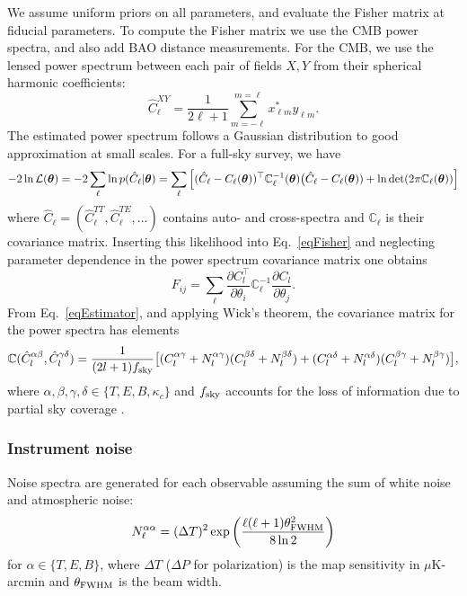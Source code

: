 We assume uniform priors on all parameters, and evaluate the Fisher matrix at fiducial parameters. To compute the Fisher matrix we use the CMB power spectra, and also add BAO distance measurements. For the CMB, we use the lensed power spectrum between each pair of fields $X, Y$ from their spherical harmonic coefficients:
%
\begin{equation}
\label{eqEstimator}
\hat{C}^{XY}_\ell = \frac{1}{2\ell+1}\sum_{m=-\ell}^{m=\ell} x^{*}_{\ell m} y_{\ell m}.
\end{equation}
%
The estimated power spectrum follows a Gaussian distribution to good approximation at small scales. For a full-sky survey, we have 
%
\begin{equation}
-2\ln\mathcal{L}(\boldsymbol{\theta}) = -2\sum_\ell \ln p( \hat{C}_\ell | \boldsymbol{\theta}) \\
=  \sum_\ell  \Big[ (\hat{C}_\ell - C_\ell(\boldsymbol{\theta}) )^\top  \mathbb{C}^{-1}_\ell(\boldsymbol{\theta}) \big(\hat{C}_\ell - C_\ell(\boldsymbol{\theta})) + \ln \det(2 \pi \mathbb{C}_\ell(\boldsymbol{\theta})) \Big]
\end{equation}
%
where $ \hat{C}_\ell = (\hat{C}_\ell^{TT}, \hat{C}_\ell^{TE}, ...) $ contains auto- and cross-spectra and $\mathbb{C}_\ell$ is their covariance matrix. Inserting this likelihood into Eq.~\ref{eqFisher} and neglecting parameter dependence in the power spectrum covariance matrix one obtains
%
\begin{equation}
F_{ij} = \sum_\ell \frac{\partial C^\top_l}{\partial \theta_i} \mathbb{C}^{-1}_\ell \frac{\partial C_l}{\partial \theta_j}.
\end{equation}
%
From Eq.~\ref{eqEstimator}, and applying Wick's theorem, the covariance matrix for the power spectra has elements
%
\begin{equation}
\mathbb{C}(\hat{C}_l^{\alpha \beta}, \hat{C}_l^{\gamma \delta}) = \frac{1}{(2l+1)f_{\rm sky}} \big[ (C_l^{\alpha \gamma} + N_l^{\alpha \gamma}) (C_l^{\beta \delta} + N_l^{\beta \delta})  \\
+ (C_l^{\alpha \delta} + N_l^{\alpha \delta}) (C_l^{\beta \gamma} + N_l^{\beta \gamma}) \big],
\end{equation}
%
where $\alpha, \beta, \gamma, \delta \in \{T, E, B, \kappa_c\}$ and $f_{\rm sky}$ accounts for the loss of information due to partial sky coverage \cite{Hobson:1996,dePutter:2009}. 


\subsubsection{Instrument noise}
Noise spectra are generated for each observable assuming the sum of white noise and atmospheric noise:
%
\begin{equation}
N^{\alpha \alpha}_\ell = (\Delta T)^2 \exp \left( \frac{\ell(\ell + 1) \theta^2_{\rm FWHM}}{8 \ln 2} \right)
\end{equation}
%
for $\alpha \in \{T, E, B\}$, where $\Delta T$ ($\Delta P$ for polarization) is the map sensitivity in $\mu$K-arcmin and $\theta_{\rm FWHM}$ is the beam width. 

